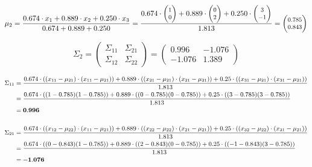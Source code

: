 \documentclass[12pt]{article}
\begin{document}
\begin{enumerate}
    \begin{equation*}
        \fontsize{8pt}{10pt}\selectfont
        \mu_2 = \frac{0.674 \cdot x_1 + 0.889 \cdot x_2 + 0.250 \cdot x_3}{0.674+0.889+0.250} = \frac{0.674 \cdot \begin{pmatrix}
        1\\
        0
        \end{pmatrix}+ 0.889 \cdot \begin{pmatrix}
        0\\
        2
        \end{pmatrix} + 0.250 \cdot \begin{pmatrix}
        3\\
        -1
        \end{pmatrix}}{1.813} = \begin{pmatrix}
        0.785\\
        0.843
        \end{pmatrix}
    \end{equation*}

    \begin{equation*}
        \Sigma_2 = \begin{pmatrix}
            \Sigma_{11} & \Sigma_{21} \\
            \Sigma_{12} & \Sigma_{22}
        \end{pmatrix} = \begin{pmatrix}
            0.996 & -1.076 \\
            -1.076 & 1.389
        \end{pmatrix}
    \end{equation*}

    \begin{equation*}
        \fontsize{9pt}{10pt}\selectfont
        \begin{aligned}
            \Sigma_{11} &= \frac{0.674 \cdot ((x_{11}-\mu_{21}) \cdot (x_{11} - \mu_{21}))+ 0.889 \cdot ((x_{21}-\mu_{21}) \cdot (x_{21} - \mu_{21}))+ 0.25 \cdot ((x_{31}-\mu_{21}) \cdot (x_{31} - \mu_{21}))}{1.813}\\
            &=\frac{0.674 \cdot ((1-0.785)(1-0.785)) + 0.889 \cdot ((0-0.785)(0-0.785))+ 0.25 \cdot ((3-0.785)(3-0.785))}{1.813} \\
            &= \mathbf{0.996}\\
            \\
            \Sigma_{21} &= \frac{0.674 \cdot ((x_{12}-\mu_{22}) \cdot (x_{11} - \mu_{21}))+ 0.889 \cdot ((x_{22}-\mu_{22}) \cdot (x_{21} - \mu_{21}))+ 0.25 \cdot ((x_{32}-\mu_{22}) \cdot (x_{31} - \mu_{21}))}{1.813}\\
            &=\frac{0.674 \cdot ((0-0.843)(1-0.785)) + 0.889 \cdot ((2-0.843)(0-0.785)) + 0.25 \cdot ((-1-0.843)(3-0.785))}{1.813} \\
            &= \mathbf{-1.076}\\
            \\
        \end{aligned}
    \end{equation*}


\end{enumerate}
\end{document}
